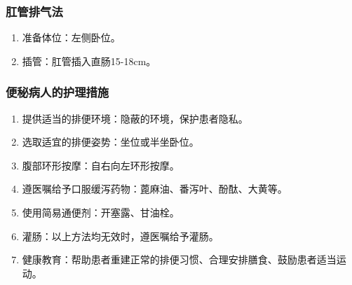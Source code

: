 \documentclass[11pt, a4paper]{ctexart}
\begin{document}
\subsubsection{肛管排气法}
\begin{enumerate}
    \item 准备体位：左侧卧位。
    \item 插管：肛管插入直肠15-18cm。
\end{enumerate}

\subsubsection{便秘病人的护理措施}
\begin{enumerate}
    \item 提供适当的排便环境：隐蔽的环境，保护患者隐私。
    \item 选取适宜的排便姿势：坐位或半坐卧位。
    \item 腹部环形按摩：自右向左环形按摩。
    \item 遵医嘱给予口服缓泻药物：蓖麻油、番泻叶、酚酞、大黄等。
    \item 使用简易通便剂：开塞露、甘油栓。
    \item 灌肠：以上方法均无效时，遵医嘱给予灌肠。
    \item 健康教育：帮助患者重建正常的排便习惯、合理安排膳食、鼓励患者适当运动。
\end{enumerate}
\end{document}
